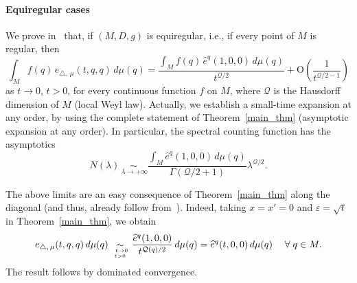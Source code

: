 \documentclass[AHL,Unicode,published]{cedram}
\newcommand{\calQ}{\mathcal{Q}}
\newcommand{\rmO}{\mathrm{O}}
\let\oldforall\forall
\renewcommand*{\forall}{\mathrel{\oldforall}}
\begin{document}
\goodbreak
\paragraph{Equiregular cases}
We prove in~\cite{CHT-II} that, if $(M,D,g)$ is equiregular, i.e., if every point of $M$ is regular, then
\[
\int_M f(q)\, e_{\triangle,\,\mu}(t,q,q) \, d\mu (q) = \frac{\int _M f(q)\, \widehat{e}^{q}(1,0,0) \, d\mu(q)}{t^{\calQ/2}} + \rmO\left(\frac{1}{t^{\calQ/2-1}} \right)
\]
as $t\rightarrow 0$, $t>0$, for every continuous function $f$ on $M$, where $\calQ$ is the Hausdorff dimension of $M$ (local Weyl law). Actually, we establish a small-time expansion at any order, by using the complete statement of Theorem~\ref{main_thm} (asymptotic expansion at any order). In particular, the spectral counting function has the asymptotics
\[
N(\lambda) \underset{\ \lambda\rightarrow+\infty}{\sim} \frac{\int_M \widehat{e}^{q}(1,0,0) \, d\mu(q)}{\Gamma(\calQ/2+1)} \lambda^{\calQ/2}.
\]
\goodbreak

The above limits are an easy consequence of Theorem~\ref{main_thm} along the diagonal (and thus, already follow from~\cite{BenArous_AIF1989,Metivier1976}). Indeed, taking $x=x'=0$ and $\varepsilon=\sqrt{t}$ in Theorem~\ref{main_thm}, we obtain
\[
e_{\triangle,\,\mu}(t,q,q)\, d\mu(q) \underset{\ t\rightarrow 0\atop t>0}{\sim} \frac{\widehat{e}^{q}(1,0,0)}{t^{\calQ(q)/2}}\, d\mu(q) = \widehat{e}^{q}(t,0,0) \, d\mu(q) \quad \forall q\in M.
\]
The result follows by dominated convergence.
\end{document}
